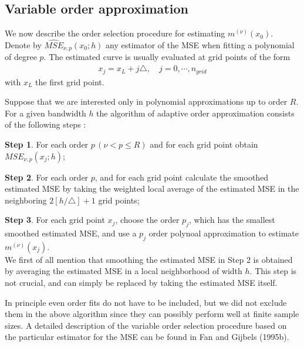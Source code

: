 \documentclass[12pt]{article}
\renewcommand{\=}[1]{\stackrel{#1}{=}} %
\theoremstyle{definition}
\begin{document}
\subsection{Variable order approximation}
	We now describe the order selection procedure for estimating $m^{(\nu)}(x_0)$. Denote by $\hat{MSE}_{\nu,p}(x_0;h)$ any estimator of the MSE when fitting a polynomial of degree $p$. The estimated curve is usually evaluated at grid points of the form
	\begin{align}
	x_j=x_L+j\triangle,\quad j=0,\cdots,n_{grid}
	\end{align}
	with $x_L$ the first grid point.
	
	Suppose that we are interested only in polynomial approximations up to order $R$. For a given bandwidth $h$ the algorithm of adaptive order approximation consists of the following steps :
	
	\textbf{Step 1}. For each order $p\,(\nu < p \leq R)$ and for each grid point obtain $MSE_{\nu,p}(x_j;h)$; 
	
	\textbf{Step 2}. For each order $p$, and for each grid point calculate the smoothed estimated MSE by taking the weighted local average of the estimated MSE in the neighboring $2[h/\triangle]+1$ grid points; 
	
	\textbf{Step 3}. For each grid point $x_j$, choose the order $p_j$, which has the smallest smoothed estimated MSE, and use a $p_j$ order polynoal approximation to estimate $m^{(\nu)}(x_j)$. \\
	
	We first of all mention that smoothing the estimated MSE in Step 2 is obtained by averaging the estimated MSE in a local neighborhood of width $h$. This step is not crucial, and can simply be replaced by taking the estimated MSE itself. 
	
	In principle even order fits do not have to be included, but we did not exclude them in the above algorithm since they can possibly perform well at finite sample sizes. A detailed description of the variable order selection procedure based on the particular estimator for the MSE can be found in Fan and Gijbels (1995b). 
	
\end{document}
